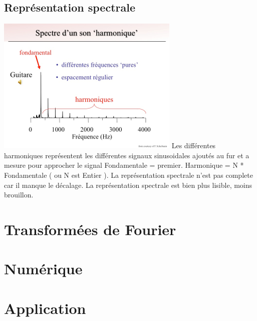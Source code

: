 \documentclass{article}
\begin{document}
\subsection{Repr\'esentation spectrale}
\includegraphics{img/spectre.jpg}
\newline \newline
Les diff\'erentes harmoniques repr\'esentent les diff\'erentes signaux sinusoidales ajout\'es au fur et a mesure pour approcher le signal 
Fondamentale = premier.
Harmonique = N * Fondamentale ( ou N est Entier ).
La repr\'esentation spectrale n'est pas complete car il manque le d\'ecalage.
La repr\'esentation spectrale est bien plus lisible, moins brouillon.


\section{Transform\'ees de Fourier}

\section{Num\'erique}

\section{Application}
\end{document}
